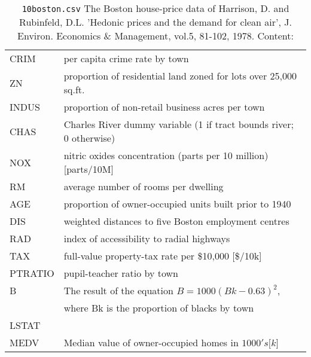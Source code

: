 \documentclass[12pt]{article}
\theoremstyle{remark}
\begin{document}
\begin{table}
	\caption{ \texttt{10boston.csv}
The Boston house-price data of Harrison, D. and Rubinfeld, D.L. 'Hedonic prices and the demand for clean air', J. Environ. Economics & Management, vol.5, 81-102, 1978. Content:
}
	\begin{tabular}{l|l}\hline
CRIM & per capita crime rate by town \\
ZN & proportion of residential land zoned for lots over 25,000 sq.ft. \\
INDUS & proportion of non-retail business acres per town \\
CHAS & Charles River dummy variable (1 if tract bounds river; 0 otherwise) \\
NOX & nitric oxides concentration (parts per 10 million) [parts/10M] \\
RM & average number of rooms per dwelling \\
AGE & proportion of owner-occupied units built prior to 1940 \\
DIS & weighted distances to five Boston employment centres \\
RAD & index of accessibility to radial highways \\
TAX & full-value property-tax rate per \$10,000 [\$/10k] \\
PTRATIO & pupil-teacher ratio by town \\
B & The result of the equation $B=1000(Bk - 0.63)^2$, \\
& where Bk is the proportion of blacks by town \\
LSTAT & \\ %
MEDV & Median value of owner-occupied homes in $1000's [k$] \\
	\hline
	\end{tabular}
\end{table}

\newpage
\end{document}
